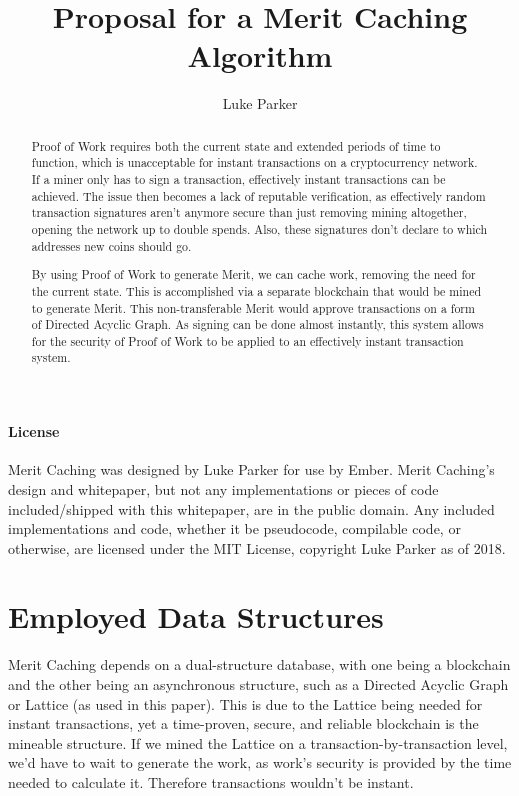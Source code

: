 \documentclass[14pt]{article}
\title{Proposal for a Merit Caching Algorithm}
\author{Luke Parker}
\begin{document}
\maketitle

\label{sec:abstract}
\begin{abstract}
Proof of Work requires both the current state and extended periods of time to function, which is unacceptable for instant transactions on a cryptocurrency network. If a miner only has to sign a transaction, effectively instant transactions can be achieved. The issue then becomes a lack of reputable verification, as effectively random transaction signatures aren't anymore secure than just removing mining altogether, opening the network up to double spends. Also, these signatures don't declare to which addresses new coins should go.

By using Proof of Work to generate Merit, we can cache work, removing the need for the current state. This is accomplished via a separate blockchain that would be mined to generate Merit. This non-transferable Merit would approve transactions on a form of Directed Acyclic Graph. As signing can be done almost instantly, this system allows for the security of Proof of Work to be applied to an effectively instant transaction system.
\end{abstract}

\label{sec:license}
\paragraph{License}
Merit Caching was designed by Luke Parker for use by Ember. Merit Caching's design and whitepaper, but not any implementations or pieces of code included/shipped with this whitepaper, are in the public domain. Any included implementations and code, whether it be pseudocode, compilable code, or otherwise, are licensed under the MIT License, copyright Luke Parker as of 2018.

\newpage

\label{sec:toc}
\setcounter{tocdepth}{3}
\tableofcontents

\newpage

\label{sec:1}
\section{Employed Data Structures}
Merit Caching depends on a dual-structure database, with one being a blockchain and the other being an asynchronous structure, such as a Directed Acyclic Graph or Lattice (as used in this paper). This is due to the Lattice being needed for instant transactions, yet a time-proven, secure, and reliable blockchain is the mineable structure. If we mined the Lattice on a transaction-by-transaction level, we'd have to wait to generate the work, as work's security is provided by the time needed to calculate it. Therefore transactions wouldn't be instant.
\end{document}
